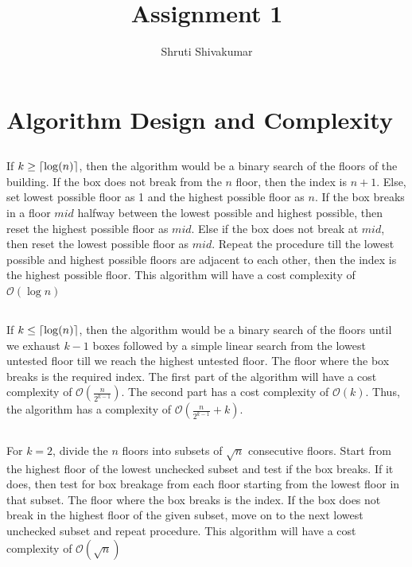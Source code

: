 \documentclass[a4paper]{article}
\title{Assignment 1}
\author{Shruti Shivakumar}
\DeclarePairedDelimiter\ceil{\lceil}{\rceil}
\begin{document}
\maketitle

\section{Algorithm Design and Complexity}
\subsection{}
If $k \geq \ceil*{\log (n)}$, then the algorithm would be a binary search of the floors of the building. If the box does not break from the $n$ floor, then the index is $n+1$. Else, set lowest possible floor as 1 and the highest possible floor as $n$. If the box breaks in a floor $mid$ halfway between the lowest possible and highest possible, then reset the highest possible floor as $mid$. Else if the box does not break at $mid$, then reset the lowest possible floor as $mid$. Repeat the procedure till the lowest possible and highest possible floors are adjacent to each other, then the index is the highest possible floor. This algorithm will have a cost complexity of $\mathcal{O}(\log n)$
\subsection{}
If $k \leq \ceil*{\log (n)}$, then the algorithm would be a binary search of the floors until we exhaust $k-1$ boxes followed by a simple linear search from the lowest untested floor till we reach the highest untested floor. The floor where the box breaks is the required index. The first part of the algorithm will have a cost complexity of $\mathcal{O}(\frac{n}{2^{k-1}})$. The second part has a cost complexity of $\mathcal{O}(k)$. Thus, the algorithm has a complexity of $\mathcal{O}(\frac{n}{2^{k-1}} + k)$. 
\subsection{}
For $k=2$, divide the $n$ floors into subsets of $\sqrt{n}$ consecutive floors. Start from the highest floor of the lowest unchecked subset and test if the box breaks. If it does, then test for box breakage from each floor starting from the lowest floor in that subset. The floor where the box breaks is the index. If the box does not break in the highest floor of the given subset, move on to the next lowest unchecked subset and repeat procedure. This algorithm will have a cost complexity of $\mathcal{O}(\sqrt{n})$
\end{document}
